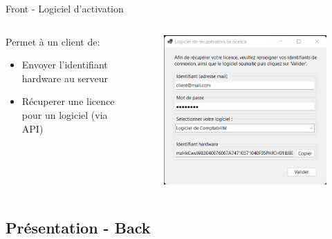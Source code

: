 \documentclass{cubeamer}
\begin{document}
\begin{frame}{Front - Logiciel d'activation}
    \begin{columns}

        \begin{column}{.5\textwidth}
            Permet à un client de:
            \begin{itemize}
                \item Envoyer l'identifiant hardware au serveur 
                \item Récuperer une licence pour un logiciel (via API)
            \end{itemize}
        \end{column}

        \begin{column}{.5\textwidth}
            \begin{figure}
                \includegraphics[scale=0.5]{img/activation-soft.png}
            \end{figure}  
        \end{column} 

    \end{columns}
\end{frame}

\subsection{Présentation - Back}
\end{document}

